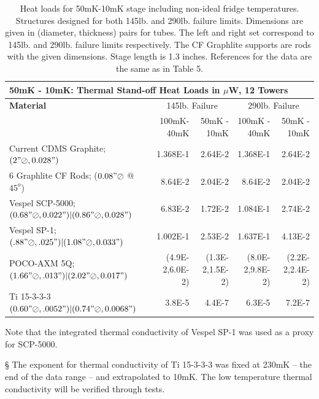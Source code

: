 \documentclass{report}
\begin{document}
\begin{table}[h]
\begin{small}
\begin{threeparttable}
\begin{tabular}{lrrrr}
  \multicolumn{5}{l}{{\Large 50mK - 10mK: Thermal Stand-off Heat Loads in $\mu$W, 12 Towers}} \\
\toprule
\bf{{\large Material}}& \multicolumn{2}{c}{145lb. Failure} & \multicolumn{2}{c}{290lb. Failure} \\
\cmidrule(r){2-5}
& 100mK-40mK & 50mK - 10mK & 100mK - 40mK & 50mK - 10mK \\
Current CDMS Graphite; $(2"\oslash,0.028")$  & 1.368E-1 & 2.64E-2 & 1.368E-1 & 2.64E-2\\
6 Graphlite CF Rods; ($0.08" \oslash$ @ $45^{o}$) & 8.64E-2 & 2.04E-2 & 8.64E-2 & 2.04E-2 \\
Vespel SCP-5000; $(0.68"\oslash,0.022")|(0.86"\oslash,0.028")$ & 6.83E-2\tnote{\dag} & 1.72E-2\tnote{\dag} & 1.084E-1\tnote{\dag} & 2.74E-2\tnote{\dag} \\
Vespel SP-1; $(.88"\oslash,.025")|(1.08"\oslash,0.033")$ & 1.002E-1 & 2.53E-2 & 1.637E-1 & 4.13E-2 \\
POCO-AXM 5Q; $(1.66"\oslash,.013")|(2.02"\oslash,0.017")$ & (4.9E-2,6.0E-2) & (1.3E-2,1.5E-2) & (8.0E-2,9.8E-2) & (2.2E-2,2.4E-2) \\
Ti 15-3-3-3 $(0.60"\oslash,.0052")|(0.74"\oslash,0.0068")$ & 3.8E-5\tnote{\S} & 4.4E-7\tnote{\S} & 6.3E-5\tnote{\S} & 7.2E-7\tnote{\S} \\
\bottomrule
\end{tabular}
\begin{tablenotes}
\item[\dag] Note that the integrated thermal conductivity of Vespel SP-1 was used as a proxy for SCP-5000.
\item[\S] The exponent for thermal conductivity of Ti 15-3-3-3 was fixed at 230mK -- the end of the data range -- and extrapolated to 10mK. The low temperature thermal conductivity will be verified through tests.
\end{tablenotes}
\end{threeparttable}
\caption{Heat loads for 50mK-10mK stage including non-ideal fridge temperatures. Structures designed for both 145lb. and 290lb. failure limits. Dimensions are given in (diameter, thickness) pairs for tubes. The left and right set correspond to 145lb. and 290lb. failure limits respectively. The CF Graphlite supports are rods with the given dimensions. Stage length is 1.3 inches. References for the data are the same as in Table 5.}
\end{small}
\end{table}
\end{document}
